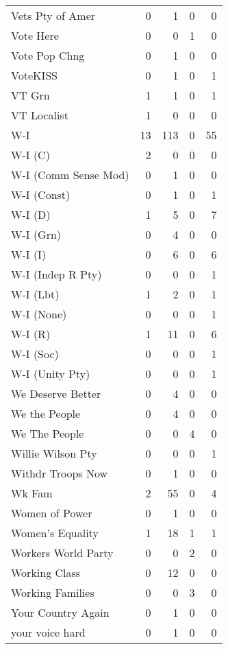 \begin{supertabular}{lrrrr}
Vets Pty of Amer & 0 & 1 & 0 & 0\\
Vote Here & 0 & 0 & 1 & 0\\
Vote Pop Chng & 0 & 1 & 0 & 0\\
VoteKISS & 0 & 1 & 0 & 1\\
VT Grn & 1 & 1 & 0 & 1\\
VT Localist & 1 & 0 & 0 & 0\\
W-I & 13 & 113 & 0 & 55\\
W-I (C) & 2 & 0 & 0 & 0\\
W-I (Comm Sense Mod) & 0 & 1 & 0 & 0\\
W-I (Const) & 0 & 1 & 0 & 1\\
W-I (D) & 1 & 5 & 0 & 7\\
W-I (Grn) & 0 & 4 & 0 & 0\\
W-I (I) & 0 & 6 & 0 & 6\\
W-I (Indep R Pty) & 0 & 0 & 0 & 1\\
W-I (Lbt) & 1 & 2 & 0 & 1\\
W-I (None) & 0 & 0 & 0 & 1\\
W-I (R) & 1 & 11 & 0 & 6\\
W-I (Soc) & 0 & 0 & 0 & 1\\
W-I (Unity Pty) & 0 & 0 & 0 & 1\\
We Deserve Better & 0 & 4 & 0 & 0\\
We the People & 0 & 4 & 0 & 0\\
We The People & 0 & 0 & 4 & 0\\
Willie Wilson Pty & 0 & 0 & 0 & 1\\
Withdr Troops Now & 0 & 1 & 0 & 0\\
Wk Fam & 2 & 55 & 0 & 4\\
Women of Power & 0 & 1 & 0 & 0\\
Women's Equality & 1 & 18 & 1 & 1\\
Workers World Party & 0 & 0 & 2 & 0\\
Working Class & 0 & 12 & 0 & 0\\
Working Families & 0 & 0 & 3 & 0\\
Your Country Again & 0 & 1 & 0 & 0\\
your voice hard & 0 & 1 & 0 & 0\\
\bottomrule
\end{supertabular}
